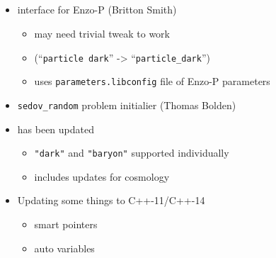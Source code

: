 \NEWSEC


\subsection{\ssRecentMisc}

\begin{frame}[fragile,label=ss-recent-misc] 
\secframetitle{\ssRecentMisc}
\begin{itemize}
\item {} interface for Enzo-P (Britton Smith)
\begin{itemize}
\item may need trivial tweak to work
\item (``\verb+particle dark+'' -> ``\verb+particle_dark+'')
\item uses \verb+parameters.libconfig+ file of Enzo-P parameters
\end{itemize}
\item \verb+sedov_random+ problem initialier (Thomas Bolden)
\item {} has been updated
\begin{itemize}
\item \verb+"dark"+ and \verb+"baryon"+ supported individually
\item includes updates for cosmology
\end{itemize}
\item Updating some things to C++-11/C++-14
\begin{itemize}
\item  smart pointers
\item  auto variables
\end{itemize}
\end{itemize}
\end{frame}
